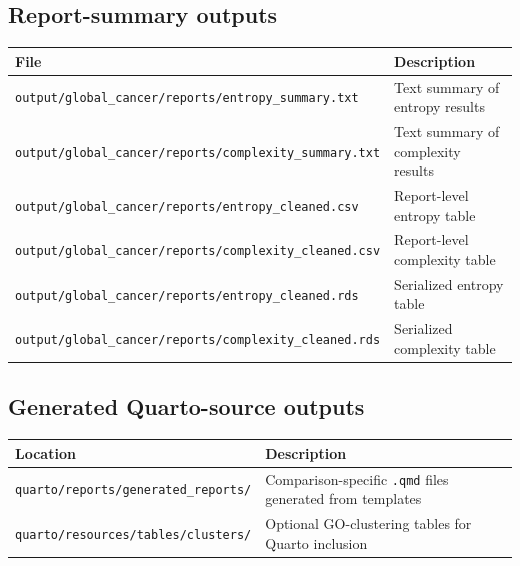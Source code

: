 \documentclass[
  letterpaper,
  DIV=11,
  numbers=noendperiod,
  openany,
  oneside]{scrreprt}
\begin{document}
\subsection*{Report-summary outputs}\label{report-summary-outputs}

\begin{longtable}[]{@{}
  >{\raggedright\arraybackslash}p{}
  >{\raggedright\arraybackslash}p{}@{}}
\toprule\noalign{}
\begin{minipage}[b]{\linewidth}\raggedright
File
\end{minipage} & \begin{minipage}[b]{\linewidth}\raggedright
Description
\end{minipage} \\
\midrule\noalign{}
\endhead
\bottomrule\noalign{}
\endlastfoot
\texttt{output/global\_cancer/reports/entropy\_summary.txt} & Text
summary of entropy results \\
\texttt{output/global\_cancer/reports/complexity\_summary.txt} & Text
summary of complexity results \\
\texttt{output/global\_cancer/reports/entropy\_cleaned.csv} &
Report-level entropy table \\
\texttt{output/global\_cancer/reports/complexity\_cleaned.csv} &
Report-level complexity table \\
\texttt{output/global\_cancer/reports/entropy\_cleaned.rds} & Serialized
entropy table \\
\texttt{output/global\_cancer/reports/complexity\_cleaned.rds} &
Serialized complexity table \\
\end{longtable}

\subsection*{Generated Quarto-source
outputs}\label{generated-quarto-source-outputs}

\begin{longtable}[]{@{}
  >{\raggedright\arraybackslash}p{}
  >{\raggedright\arraybackslash}p{}@{}}
\toprule\noalign{}
\begin{minipage}[b]{\linewidth}\raggedright
Location
\end{minipage} & \begin{minipage}[b]{\linewidth}\raggedright
Description
\end{minipage} \\
\midrule\noalign{}
\endhead
\bottomrule\noalign{}
\endlastfoot
\texttt{quarto/reports/generated\_reports/} & Comparison-specific
\texttt{.qmd} files generated from templates \\
\texttt{quarto/resources/tables/clusters/} & Optional GO-clustering
tables for Quarto inclusion \\
\end{longtable}
\end{document}
